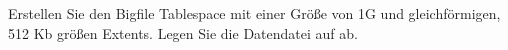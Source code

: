     \item Erstellen Sie den Bigfile Tablespace  mit einer Gr\"o\ss{}e von 1G und gleichf\"ormigen, 512 Kb gr\"o\ss{}en Extents. Legen Sie die Datendatei  auf  ab.
